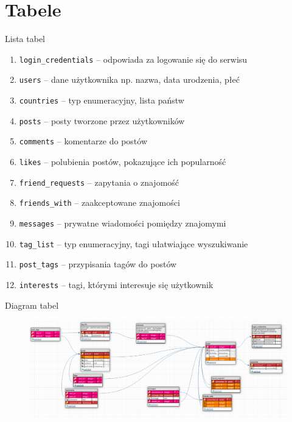 \documentclass[handout]{beamer}
\begin{document}
        \section{Tabele}
        \begin{frame}[fragile]{Lista tabel}
            \begin{enumerate}
                \item \verb|login_credentials| -- odpowiada za logowanie się do serwisu \pause
                \item \verb|users| -- dane użytkownika np. nazwa, data urodzenia, płeć \pause
                \item \verb|countries| -- typ enumeracyjny, lista państw \pause
                \item \verb|posts| -- posty tworzone przez użytkowników \pause
                \item \verb|comments| -- komentarze do postów \pause
                \item \verb|likes| -- polubienia postów, pokazujące ich popularność \pause
                \item \verb|friend_requests| -- zapytania o znajomość \pause
                \item \verb|friends_with| -- zaakceptowane znajomości \pause
                \item \verb|messages| -- prywatne wiadomości pomiędzy znajomymi \pause
                \item \verb|tag_list| -- typ enumeracyjny, tagi ułatwiające wyszukiwanie \pause
                \item \verb|post_tags| -- przypisania tagów do postów \pause
                \item \verb|interests| -- tagi, którymi interesuje się użytkownik
            \end{enumerate}
        \end{frame}
        \begin{frame}[fragile]{Diagram tabel}
            \begin{figure}
                \centering   %
                \includegraphics[width=\textwidth]{database_diagram.png}
            \end{figure}
        \end{frame}
\end{document}
